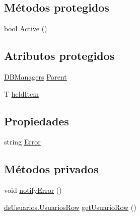 \subsection*{Métodos protegidos}
\begin{DoxyCompactItemize}
\item 
bool \hyperlink{class_proyecto___integrador__3_1_1_d_b_managers_1_1_d_b_manager_3_01_t_01_4_add66e324cef43fd10b491bc697fa60b5}{Active} ()
\end{DoxyCompactItemize}
\subsection*{Atributos protegidos}
\begin{DoxyCompactItemize}
\item 
\hyperlink{class_proyecto___integrador__3_1_1_d_b_managers}{D\-B\-Managers} \hyperlink{class_proyecto___integrador__3_1_1_d_b_managers_1_1_d_b_manager_3_01_t_01_4_a06315e75298c8f2fd46f32dc7c9a80b2}{Parent}
\item 
T \hyperlink{class_proyecto___integrador__3_1_1_d_b_managers_1_1_d_b_manager_3_01_t_01_4_a3b67ae3b5b3b9c3793d56c1407d7dcff}{held\-Item}
\end{DoxyCompactItemize}
\subsection*{Propiedades}
\begin{DoxyCompactItemize}
\item 
string \hyperlink{class_proyecto___integrador__3_1_1_d_b_managers_1_1_d_b_manager_3_01_t_01_4_a6e5caaed2ee1a4d067dfbf5aaa1b1fa8}{Error}
\end{DoxyCompactItemize}
\subsection*{Métodos privados}
\begin{DoxyCompactItemize}
\item 
void \hyperlink{class_proyecto___integrador__3_1_1_d_b_managers_1_1_usuario_d_b_manager_a6d2db3445fc5acc8a349b76029714a96}{notify\-Error} ()
\item 
\hyperlink{class_proyecto___integrador__3_1_1ds_usuarios_1_1_usuarios_row}{ds\-Usuarios.\-Usuarios\-Row} \hyperlink{class_proyecto___integrador__3_1_1_d_b_managers_1_1_usuario_d_b_manager_a4e531d5e782e81b5a70ce977fef09cf4}{get\-Usuario\-Row} ()
\end{DoxyCompactItemize}


